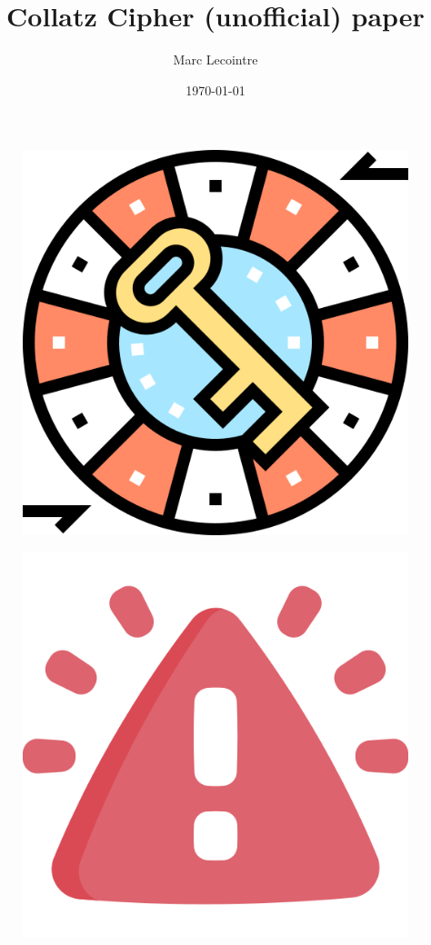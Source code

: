 \documentclass{article}
\begin{document}
\title{\huge{Collatz Cipher (unofficial) paper}}

\author{Marc Lecointre}

\date{\today}

\maketitle

\begin{figure}[H]
    \centering
    \includegraphics[scale=0.225]{logo}
\end{figure}

\begin{figure}[H]
    \centering
    \includegraphics[scale=0.18]{warning}
\end{figure}
\end{document}
